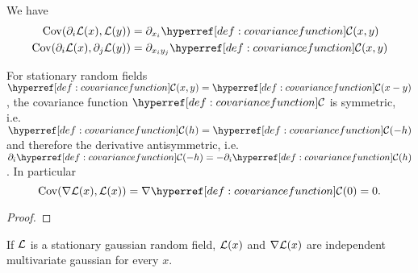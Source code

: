 \begin{lemma}
	\label{lem: covariance of derivative}
	We have
	\begin{align*}
		\Cov(\partial_i\Loss(x), \Loss(y)) &= \partial_{x_i} \C(x,y)\\
		\Cov(\partial_i\Loss(x), \partial_j \Loss(y)) &= \partial_{x_i y_j} \C(x,y)
	\end{align*}
\end{lemma}
\begin{remark}\label{rem: covariance uncorrelated}
	For stationary random fields \(\C(x,y)=\C(x-y)\), the covariance
	function \(\C\) is symmetric, i.e. \(\C(h)=\C(-h)\)
	and therefore the derivative antisymmetric, i.e.
	\(\partial_i\C(-h)=-\partial_i\C(h)\). In particular
	\begin{equation*}
		\Cov(\grad\Loss(x), \Loss(x)) = \grad \C(0)=0.
	\end{equation*}
\end{remark}
\begin{proof}
\end{proof}
\begin{corollary}
	If \(\mathcal{L}\) is a stationary gaussian random field, \(\mathcal{L}(x)\) and
	\(\nabla\mathcal{L}(x)\) are independent multivariate gaussian for every \(x\).
\end{corollary}

